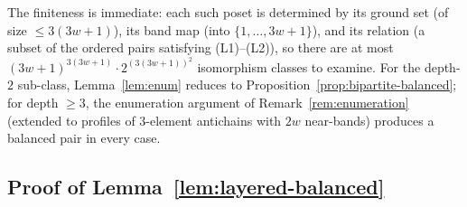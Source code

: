 The finiteness is immediate: each such poset is determined by its
ground set (of size $\le 3(3w+1)$), its band map (into
$\{1, \ldots, 3w+1\}$), and its relation (a subset of the ordered
pairs satisfying (L1)--(L2)), so there are at most
$(3w+1)^{3(3w+1)} \cdot 2^{(3(3w+1))^2}$ isomorphism classes to
examine. For the depth-$2$ sub-class, Lemma~\ref{lem:enum} reduces to
Proposition~\ref{prop:bipartite-balanced}; for depth $\ge 3$, the
enumeration argument of Remark~\ref{rem:enumeration} (extended to
profiles of $3$-element antichains with $2w$ near-bands) produces a
balanced pair in every case.

\subsection{Proof of Lemma~\ref{lem:layered-balanced}}

